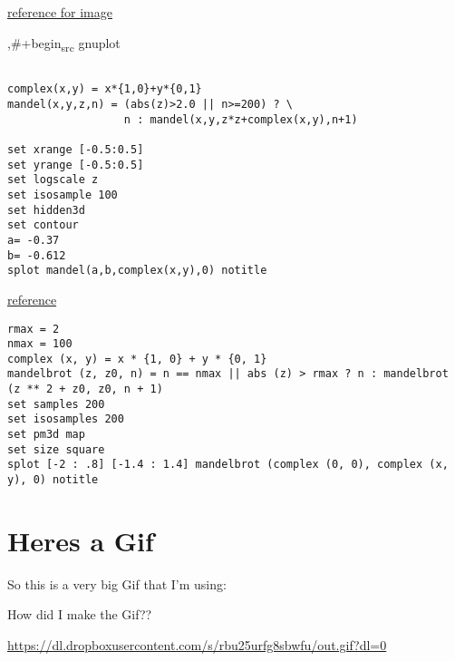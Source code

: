 \documentclass[11pt]{article}
\begin{document}
\begin{center}

\end{center}


\href{http://folk.uio.no/inf3330/scripting/doc/gnuplot/Kawano/fractal/mandelbrot-e.html}{reference for image}

,\#+begin\textsubscript{src} gnuplot
\begin{verbatim}

complex(x,y) = x*{1,0}+y*{0,1}
mandel(x,y,z,n) = (abs(z)>2.0 || n>=200) ? \
                  n : mandel(x,y,z*z+complex(x,y),n+1)

set xrange [-0.5:0.5]
set yrange [-0.5:0.5]
set logscale z
set isosample 100
set hidden3d
set contour
a= -0.37
b= -0.612
splot mandel(a,b,complex(x,y),0) notitle
\end{verbatim}

\begin{center}

\end{center}




\href{https://rosettacode.org/wiki/Mandelbrot\_set\#Python}{reference}


\begin{verbatim}
rmax = 2
nmax = 100
complex (x, y) = x * {1, 0} + y * {0, 1}
mandelbrot (z, z0, n) = n == nmax || abs (z) > rmax ? n : mandelbrot (z ** 2 + z0, z0, n + 1)
set samples 200
set isosamples 200
set pm3d map
set size square
splot [-2 : .8] [-1.4 : 1.4] mandelbrot (complex (0, 0), complex (x, y), 0) notitle
\end{verbatim}

\begin{center}

\end{center}




\section{Heres a Gif}
\label{sec:orgb5bf6d0}


So this is a very big Gif that I'm using:

How did I make the Gif??

\url{https://dl.dropboxusercontent.com/s/rbu25urfg8sbwfu/out.gif?dl=0}
\end{document}

